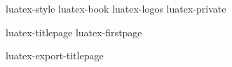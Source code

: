 

%

%
%






\environment luatex-style
\environment luatex-book
\environment luatex-logos
\environment luatex-private

\startmode[export]

    \setupbackend
      [export=luatex]

\stopmode

\startdocument
  [status=experimental,
   version=1.09]

\startnotmode[*export]
    \component luatex-titlepage
    \component luatex-firstpage
\stopnotmode

\startmode[*export]
    \component luatex-export-titlepage
\stopmode

